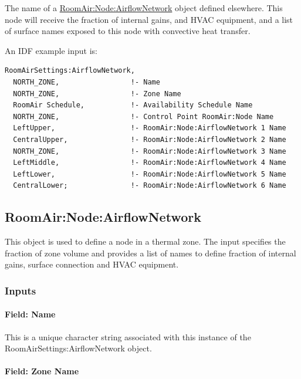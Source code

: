The name of a \hyperref[roomairnodeairflownetwork]{RoomAir:Node:AirflowNetwork} object defined elsewhere. This node will receive the fraction of internal gains, and HVAC equipment, and a list of surface names exposed to this node with convective heat transfer.

An IDF example input is:

\begin{lstlisting}
RoomAirSettings:AirflowNetwork,
  NORTH_ZONE,                 !- Name
  NORTH_ZONE,                 !- Zone Name
  RoomAir Schedule,           !- Availability Schedule Name
  NORTH_ZONE,                 !- Control Point RoomAir:Node Name
  LeftUpper,                  !- RoomAir:Node:AirflowNetwork 1 Name
  CentralUpper,               !- RoomAir:Node:AirflowNetwork 2 Name
  NORTH_ZONE,                 !- RoomAir:Node:AirflowNetwork 3 Name
  LeftMiddle,                 !- RoomAir:Node:AirflowNetwork 4 Name
  LeftLower,                  !- RoomAir:Node:AirflowNetwork 5 Name
  CentralLower;               !- RoomAir:Node:AirflowNetwork 6 Name
\end{lstlisting}

\subsection{RoomAir:Node:AirflowNetwork}\label{roomairnodeairflownetwork}

This object is used to define a node in a thermal zone. The input specifies the fraction of zone volume and provides a list of names to define fraction of internal gains, surface connection and HVAC equipment.

\subsubsection{Inputs}\label{inputs-13-012}

\paragraph{Field: Name}\label{field-name-8-017}

This is a unique character string associated with this instance of the Room\-Air\-Settings:\-Air\-flow\-Net\-work object.

\paragraph{Field: Zone Name}\label{field-zone-name-9-000}

